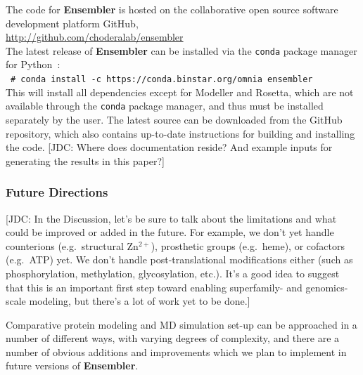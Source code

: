 \documentclass[aps,pre,twocolumn,nofootinbib,superscriptaddress,linenumbers]{revtex4-1}
\newcommand{\shellcmd}[1]{\\\ \texttt{\scriptsize\# #1}\\}
\begin{document}
The code for {\bf Ensembler} is hosted on the collaborative open source software development platform GitHub,\\
\url{http://github.com/choderalab/ensembler} \\
The latest release of {\bf Ensembler} can be installed via the {\tt conda} package manager for Python~\cite{conda}:
\shellcmd{conda install -c https://conda.binstar.org/omnia ensembler}
This will install all dependencies except for Modeller and Rosetta, which are not available through the {\tt conda} package manager, and thus must be installed separately by the user.
The latest source can be downloaded from the GitHub repository, which also contains up-to-date instructions for building and installing the code.
{\color{red}[JDC: Where does documentation reside?  And example inputs for generating the results in this paper?]}

\subsubsection*{Future Directions}

{\color{red}[JDC: In the Discussion, let's be sure to talk about the limitations and what could be improved or added in the future.  For example, we don't yet handle counterions (e.g.~structural Zn$^{2+}$), prosthetic groups (e.g.~heme), or cofactors (e.g.~ATP) yet.  We don't handle post-translational modifications either (such as phosphorylation, methylation, glycosylation, etc.).  It's a good idea to suggest that this is an important first step toward enabling superfamily- and genomics-scale modeling, but there's a lot of work yet to be done.]}

Comparative protein modeling and MD simulation set-up can be approached in a number of different ways, with varying degrees of complexity, and there are a number of obvious additions and improvements which we plan to implement in future versions of {\bf Ensembler}.
\end{document}
